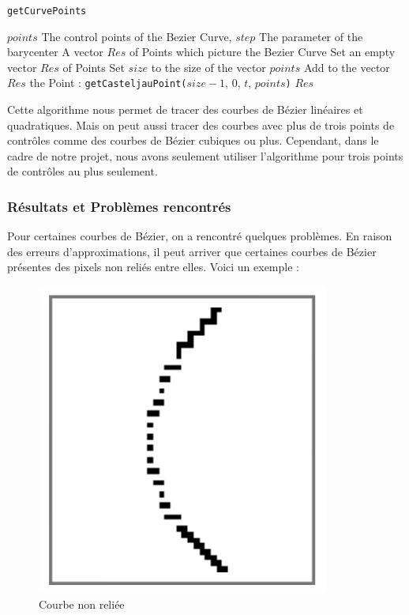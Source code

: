 \documentclass[a4paper, 12pt]{article}
\begin{document}
\begin{algorithm}
	\caption{\texttt{getCurvePoints}}
		\begin{algorithmic}[1]
		\Require $points$ The control points of the Bezier Curve, $step$ The parameter of the barycenter
		\Ensure A vector $Res$ of Points which picture the Bezier Curve
		\State Set an empty vector $Res$ of Points
		\State Set $size$ to the size of the vector $points$
			\State Add to the vector $Res$ the Point : \texttt{getCasteljauPoint(}$size-1$, $0$, $t$, $points$\texttt{)} 
		\EndFor
		\State \Return $Res$
		\EndFunction
		\end{algorithmic}
\end{algorithm}

Cette algorithme nous permet de tracer des courbes de Bézier linéaires et quadratiques. Mais on peut aussi tracer des courbes avec plus de trois points de contrôles comme des courbes de Bézier cubiques ou plus. Cependant, dans le cadre de notre projet, nous avons seulement utiliser l'algorithme pour trois points de contrôles au plus seulement.

\subsubsection{Résultats et Problèmes rencontrés}
Pour certaines courbes de Bézier, on a rencontré quelques problèmes. En raison des erreurs d'approximations, il peut arriver que certaines courbes de Bézier présentes des pixels non reliés entre elles. Voici un exemple : 

\begin{figure}[h]
\centering
\includegraphics[scale=0.3]{Images/BezierCurbe_problem.png}
\caption{Courbe non reliée}
\label{fig1}
\end{figure}
\end{document}
